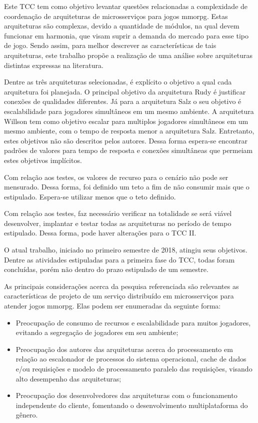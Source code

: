 Este TCC tem como objetivo levantar questões relacionadas a complexidade de coordenação de arquiteturas de microsserviços para jogos \ac{mmorpg}.
%
Estas arquiteturas são complexas, devido a quantidade de módulos, na qual devem funcionar em harmonia, que visam suprir a demanda do mercado para esse tipo de jogo.
%
Sendo assim, para melhor descrever as características de tais arquiteturas, este trabalho propõe a realização de uma análise sobre arquiteturas distintas expressas na literatura.


Dentre as três arquiteturas selecionadas, é explícito o objetivo a qual cada arquitetura foi planejada.
%
O principal objetivo da arquitetura Rudy é justificar conexões de qualidades diferentes.
%
Já para a arquitetura Salz o seu objetivo é escalabilidade para jogadores simultâneos em um mesmo ambiente.
%
A arquitetura Willson tem como objetivo escalar para multiplos jogadores simultâneos em um mesmo ambiente, com o tempo de resposta menor a arquitetura Salz.
%
Entretanto, estes objetivos não são descritos pelos autores.
%
Dessa forma espera-se encontrar padrões de valores para tempo de resposta e conexões simultâneas que permeiam estes objetivos implícitos.

Com relação aos testes, os valores de recurso para o cenário não pode ser mensurado.
%
Dessa forma, foi definido um teto a fim de não consumir mais que o estipulado.
%
Espera-se utilizar menos que o teto definido.

Com relação aos testes, faz necessário verificar na totalidade se será viável desenvolver, implantar e testar todas as arquiteturas no período de tempo estipulado.
%
Dessa forma, pode haver alterações para o TCC II.

O atual trabalho, iniciado no primeiro semestre de 2018, atingiu seus objetivos.
%
Dentre as atividades estipuladas para a primeira fase do TCC, todas foram concluídas, porém não dentro do prazo estipulado de um semestre.

As principais considerações acerca da pesquisa referenciada são relevantes as características de projeto de um serviço distribuído em microsserviços para atender jogos \ac{mmorpg}.
%
Elas podem ser enumeradas da seguinte forma:

\begin{itemize}
  \item Preocupação de consumo de recursos e escalabilidade para muitos jogadores, evitando a segregação de jogadores em seu ambiente;
  \item Preocupação dos autores das arquiteturas acerca do processamento em relação ao escalonador de processos do sistema operacional, cache de dados e/ou requisições e modelo de processamento paralelo das requisições, visando alto desempenho das arquiteturas;
  \item Preocupação dos desenvolvedores das arquiteturas com o funcionamento independente do cliente, fomentando o desenvolvimento multiplataforma do gênero.
\end{itemize}

